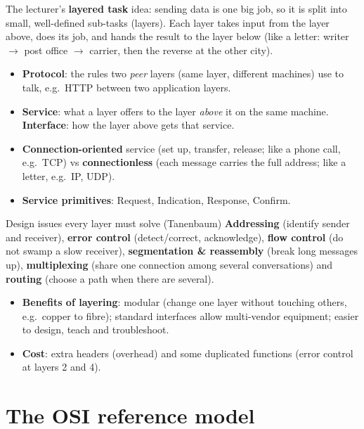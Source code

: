 \documentclass[10pt]{article}
\begin{document}
The lecturer's \textbf{layered task} idea: sending data is one big job, so it is split into small, well-defined sub-tasks (layers).
Each layer takes input from the layer above, does its job, and hands the result to the layer below (like a letter: writer $\to$ post office $\to$ carrier, then the reverse at the other city).

\begin{itemize}
\item \textbf{Protocol}: the rules two \emph{peer} layers (same layer, different machines) use to talk, e.g.\ HTTP between two application layers.
\item \textbf{Service}: what a layer offers to the layer \emph{above} it on the same machine. \textbf{Interface}: how the layer above gets that service.
\item \textbf{Connection-oriented} service (set up, transfer, release; like a phone call, e.g.\ TCP) vs \textbf{connectionless} (each message carries the full address; like a letter, e.g.\ IP, UDP).
\item \textbf{Service primitives}: Request, Indication, Response, Confirm.
\end{itemize}

\begin{keydef}{Design issues every layer must solve (Tanenbaum)}
\textbf{Addressing} (identify sender and receiver), \textbf{error control} (detect/correct, acknowledge), \textbf{flow control} (do not swamp a slow receiver),
\textbf{segmentation \& reassembly} (break long messages up), \textbf{multiplexing} (share one connection among several conversations) and \textbf{routing} (choose a path when there are several).
\end{keydef}

\begin{itemize}
\item \textbf{Benefits of layering}: modular (change one layer without touching others, e.g.\ copper to fibre); standard interfaces allow multi-vendor equipment; easier to design, teach and troubleshoot.
\item \textbf{Cost}: extra headers (overhead) and some duplicated functions (error control at layers 2 and 4).
\end{itemize}

\newpage
\section{The OSI reference model}\label{sec:osi}
\end{document}
